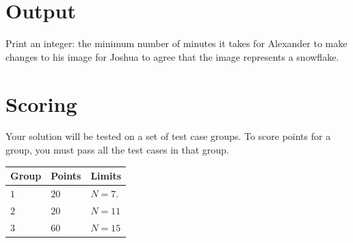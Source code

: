 \section*{Output}

Print an integer: the minimum number of minutes it takes for Alexander to make changes
to his image for Joshua to agree that the image represents a snowflake.

\section*{Scoring}

Your solution will be tested on a set of test case groups.
To score points for a group, you must pass all the test cases in that group.

\begin{tabular}{| l | l | p{12cm} |}
  \hline
  \textbf{Group} & \textbf{Points} & \textbf{Limits} \\ \hline
  $1$    & $20$       & $N=7$. \\ \hline
  $2$    & $20$       & $N=11$ \\ \hline
  $3$    & $60$       & $N=15$ \\ \hline
\end{tabular}
